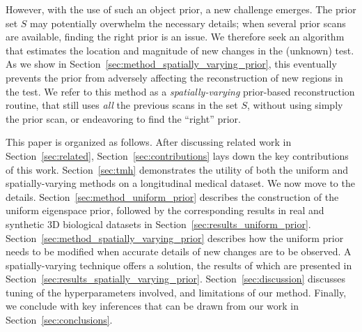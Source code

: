\documentclass[journal]{IEEEtran}
\begin{document}
 However, with the use of such an object prior, a new challenge
 emerges. The prior set $S$ may potentially overwhelm the necessary
 details; when several prior scans are available, finding the right
 prior is an issue. We therefore seek an algorithm that estimates the
 location and magnitude of new changes in the (unknown) test. As we
 show in Section~\ref{sec:method_spatially_varying_prior}, this
 eventually prevents the prior from adversely affecting the
 reconstruction of new regions in the test. We refer to this method as
 a \textit{spatially-varying} prior-based reconstruction routine, that
 still uses \textit{all} the previous scans in the set $S$, without
 using simply the prior scan, or endeavoring to find the ``right'' prior.


 This paper is organized as follows. After discussing related work in
 Section~\ref{sec:related}, Section~\ref{sec:contributions} lays down
 the key contributions of this work. Section~\ref{sec:tmh}
 demonstrates the utility of both the uniform and spatially-varying
 methods on a longitudinal medical dataset. We now move to the
 details. Section~\ref{sec:method_uniform_prior} describes the
 construction of the uniform eigenspace prior, followed by the
 corresponding results in real and synthetic 3D biological datasets in
 Section~\ref{sec:results_uniform_prior}. Section~\ref{sec:method_spatially_varying_prior}
 describes how the uniform prior needs to be modified when accurate
 details of new changes are to be observed. A spatially-varying
 technique offers a solution, the results of which are presented in
 Section~\ref{sec:results_spatially_varying_prior}. Section~\ref{sec:discussion}
 discusses tuning of the hyperparameters involved, and limitations of
 our method. Finally, we conclude with key inferences that can be
 drawn from our work in Section~\ref{sec:conclusions}.


 
\end{document}
